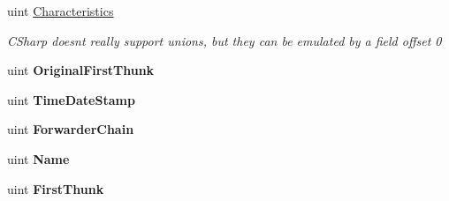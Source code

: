 \begin{DoxyCompactItemize}
\item 
uint \mbox{\hyperlink{struct_class_library_server_1_1_struct_1_1_pe_header_reader_1_1_i_m_a_g_e___i_m_p_o_r_t___d_e_s_c_r_i_p_t_o_r_a8f479da148b0273c0d57c967287e309a}{Characteristics}}
\begin{DoxyCompactList}\small\item\em C\+Sharp doesnt really support unions, but they can be emulated by a field offset 0 \end{DoxyCompactList}\item 
\mbox{\label{struct_class_library_server_1_1_struct_1_1_pe_header_reader_1_1_i_m_a_g_e___i_m_p_o_r_t___d_e_s_c_r_i_p_t_o_r_a7aa28af77ddd8b5f379860727e3b6334}} 
uint {\bfseries Original\+First\+Thunk}
\item 
\mbox{\label{struct_class_library_server_1_1_struct_1_1_pe_header_reader_1_1_i_m_a_g_e___i_m_p_o_r_t___d_e_s_c_r_i_p_t_o_r_a4b62320d8811904aa2726dbe8fb7b91d}} 
uint {\bfseries Time\+Date\+Stamp}
\item 
\mbox{\label{struct_class_library_server_1_1_struct_1_1_pe_header_reader_1_1_i_m_a_g_e___i_m_p_o_r_t___d_e_s_c_r_i_p_t_o_r_aade664257a641420164de7bf72ee1a71}} 
uint {\bfseries Forwarder\+Chain}
\item 
\mbox{\label{struct_class_library_server_1_1_struct_1_1_pe_header_reader_1_1_i_m_a_g_e___i_m_p_o_r_t___d_e_s_c_r_i_p_t_o_r_a609ffe8db4b03680f556900c1a7b00cd}} 
uint {\bfseries Name}
\item 
\mbox{\label{struct_class_library_server_1_1_struct_1_1_pe_header_reader_1_1_i_m_a_g_e___i_m_p_o_r_t___d_e_s_c_r_i_p_t_o_r_a48bd549196fca8dc614d264642f96799}} 
uint {\bfseries First\+Thunk}
\end{DoxyCompactItemize}


